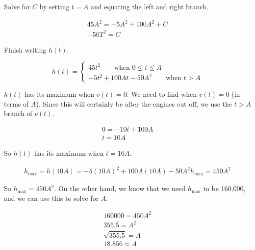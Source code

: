 \documentclass{letter}
\begin{document}
\begin{problem}{}
{      Solve for $C$ by setting $t = A$ and equating the left and right branch.

      \begin{gather*}
        45A^2 = -5A^2 + 100A^2 + C \\
        -50T^2 = C
      \end{gather*}

      Finish writing $h(t)$.

      \[
        h(t) = \begin{cases}
          45t^2 \qquad\text{when } 0 \leq t \leq A \\
          -5t^2 + 100At -50A^2 \qquad\text{when } t > A
        \end{cases}
      \]

      $h(t)$ has its maximum when $v(t) = 0$.
      We need to find when $v(t) = 0$ (in terms of $A$).
      Since this will certainly be after the engines cut off,
      we use the $t > A$ branch of $v(t)$.

      \begin{gather*}
        0 = -10t + 100A \\
        t = 10A
      \end{gather*}

      So $h(t)$ has its maximum when $t = 10A$.

      \begin{gather*}
        h_\text{max} = h(10A) = -5(10A)^2 + 100A(10A) -50A^2
        h_\text{max} = 450A^2
      \end{gather*}

      So $h_\text{max} = 450A^2$. On the other hand, we know that we
      need $h_\text{max}$ to be 160,000, and we can use this to solve
      for $A$.

      \begin{gather*}
        160000 = 450A^2 \\
        355.\bar{5} = A^2 \\
        \sqrt{355.\bar{5}} = A \\
        18.856 \approx A
      \end{gather*}
    }
  \end{problem}
\end{document}
